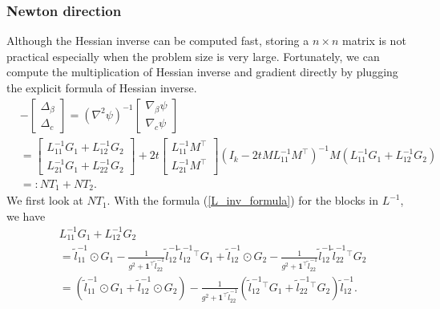 \documentclass[final,onefignum,onetabnum]{siamart190516}
\begin{document}
\subsubsection{Newton direction}
Although the Hessian inverse can be computed fast, storing a $n\times n$ matrix is not practical especially when the problem size is very large. Fortunately, we can compute the multiplication of Hessian inverse and gradient directly by plugging the explicit formula of Hessian inverse.
\begin{equation}
    \begin{aligned}
   &- \begin{bmatrix}
    \Delta_{\beta}\\
    \Delta_c
    \end{bmatrix} = \left(\nabla^{2}\psi\right)^{-1} \begin{bmatrix}
    \nabla_{\beta}\psi\\
    \nabla_{c}\psi
    \end{bmatrix} \\
    &= \begin{bmatrix}
    L^{-1}_{11} G_1 + L^{-1}_{12} G_2 \\
    L^{-1}_{21} G_1 + L^{-1}_{22} G_2
    \end{bmatrix} + 
    2t\begin{bmatrix} L^{-1}_{11}M^\top \\ L^{-1}_{21}M^\top\end{bmatrix}
    (I_k-2t M L^{-1}_{11} M^\top)^{-1}M\left(L^{-1}_{11} G_1 + L^{-1}_{12} G_2\right) \\
    &=: NT_1 + NT_2.
\end{aligned}
\end{equation}
We first look at $NT_1$. With the formula (\ref{L_inv_formula}) for the blocks in $L^{-1}$, we have
\begin{equation}\label{L11-1G1+L12-1G2}
    \begin{aligned}
            &L^{-1}_{11} G_1 + L^{-1}_{12} G_2\\
            &= \widetilde{l}^{-1}_{11} \odot G_1 - \frac{1}{g^2+\mathbf{1}^\top \widetilde{l}^{-1}_{22}}\widetilde{l}^{-1}_{12}\widetilde{l}^{-1}_{12}^\top G_1 + 
            \widetilde{l}^{-1}_{12} \odot G_2 - \frac{1}{g^2+\mathbf{1}^\top \widetilde{l}^{-1}_{22}}\widetilde{l}^{-1}_{12}\widetilde{l}^{-1}_{22}^\top G_2\\
            & = \left(\widetilde{l}^{-1}_{11} \odot G_1 +\widetilde{l}^{-1}_{12} \odot G_2 \right) - \frac{1}{g^2+\mathbf{1}^\top \widetilde{l}^{-1}_{22}}\left(\widetilde{l}^{-1}_{12}^\top G_1 + \widetilde{l}^{-1}_{22}^\top G_2\right)\widetilde{l}^{-1}_{12}.
    \end{aligned}
\end{equation}
\end{document}
